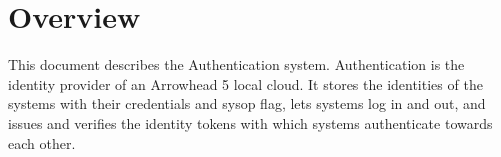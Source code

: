 \documentclass[a4paper]{arrowhead}
\begin{document}
\sloppy

\ArrowheadSetup

\begin{center}
  \vspace*{1cm}
  \huge{\arrowtitle}

  \vspace*{0.2cm}
  \LARGE{\arrowtype}
  \vspace*{1cm}

  \vspace*{\fill}


  \vspace*{1cm}
  \vspace*{\fill}

  \begin{abstract}
    This document describes the Authentication core system of the Eclipse Arrowhead 5.2.2 framework, as implemented in Java Spring in \texttt{ah5-core-java-spring/authentication}, including the local extensions of this workspace.
  \end{abstract}

  \vspace*{1cm}
\end{center}

\newpage

\tableofcontents
\newpage

\section{Overview}
\label{sec:overview}

This document describes the Authentication system. Authentication is the identity provider of an Arrowhead 5 local cloud. It stores the identities of the systems with their credentials and sysop flag, lets systems log in and out, and issues and verifies the identity tokens with which systems authenticate towards each other.
\end{document}
